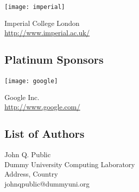 \documentclass[a4paper,UKenglish]{oasicsmaster-v2016}
\begin{document}
\noindent
\begin{minipage}{0.6\textwidth}
  \begin{center}
  \texttt{[image: imperial]}
  \end{center}
\end{minipage}
\begin{minipage}{0.39\textwidth}
  Imperial College London\\
  \url{http://www.imperial.ac.uk/}
\end{minipage}

\bigskip
\section*{Platinum Sponsors}
\bigskip

\noindent
\begin{minipage}{0.6\textwidth}
  \begin{center}
  \texttt{[image: google]}
  \end{center}
\end{minipage}
\begin{minipage}{0.39\textwidth}
  Google Inc.\\
  \url{http://www.google.com/}
\end{minipage}


\begin{participants}
\chapter[Authors]{List of Authors}
\participant John Q. Public\\ 
  Dummy University Computing Laboratory\\
  Address, Country\\
  johnqpublic@dummyuni.org

\end{participants} 
\end{document}
